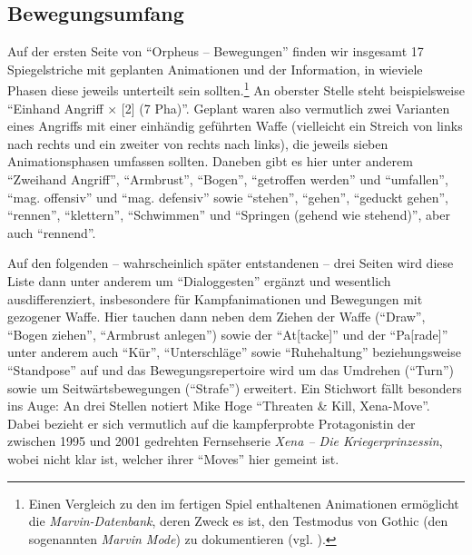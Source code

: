 \documentclass[a5paper,pagesize,numbers=noenddot]{scrbook}
\begin{document}
\subsection{Bewegungsumfang}\label{sec:orpheus_darstellung_bewegungsumfang}
Auf der ersten Seite von \enquote{Orpheus -- Bewegungen} finden wir insgesamt 17 Spiegelstriche mit geplanten Animationen und der Information, in wieviele Phasen diese jeweils unterteilt sein sollten.\footnote{Einen Vergleich zu den im fertigen Spiel enthaltenen Animationen ermöglicht die \textit{Marvin-Datenbank}, deren Zweck es ist, den Testmodus von Gothic (den sogenannten \textit{Marvin Mode}) zu dokumentieren (vgl. \autocite{sillus_marvin_2020}).}
An oberster Stelle steht beispielsweise \enquote{Einhand Angriff × [2] (7 Pha)}.
Geplant waren also vermutlich zwei Varianten eines Angriffs mit einer einhändig geführten Waffe (vielleicht ein Streich von links nach rechts und ein zweiter von rechts nach links), die jeweils sieben Animationsphasen umfassen sollten.
Daneben gibt es hier unter anderem \enquote{Zweihand Angriff}, \enquote{Armbrust}, \enquote{Bogen}, \enquote{getroffen werden} und \enquote{umfallen}, \enquote{mag. offensiv} und \enquote{mag. defensiv} sowie \enquote{stehen}, \enquote{gehen}, \enquote{geduckt gehen}, \enquote{rennen}, \enquote{klettern}, \enquote{Schwimmen} und \enquote{Springen (gehend wie stehend)}, aber auch \enquote{rennend}.

Auf den folgenden -- wahrscheinlich später entstandenen -- drei Seiten wird diese Liste dann unter anderem um \enquote{Dialoggesten} ergänzt und wesentlich ausdifferenziert, insbesondere für Kampfanimationen und Bewegungen mit gezogener Waffe.
Hier tauchen dann neben dem Ziehen der Waffe (\enquote{Draw}, \enquote{Bogen ziehen}, \enquote{Armbrust anlegen}) sowie der \enquote{At[tacke]} und der \enquote{Pa[rade]} unter anderem auch \enquote{Kür}, \enquote{Unterschläge} sowie \enquote{Ruhehaltung} beziehungsweise \enquote{Standpose} auf und das Bewegungsrepertoire wird um das Umdrehen (\enquote{Turn}) sowie um Seitwärtsbewegungen (\enquote{Strafe}) erweitert.
Ein Stichwort fällt besonders ins Auge:
An drei Stellen notiert Mike Hoge \enquote{Threaten \& Kill, Xena-Move}.
Dabei bezieht er sich vermutlich auf die kampferprobte Protagonistin der zwischen 1995 und 2001 gedrehten Fernsehserie \textit{Xena -- Die Kriegerprinzessin}, wobei nicht klar ist, welcher ihrer \enquote{Moves} hier gemeint ist. %
\end{document}
